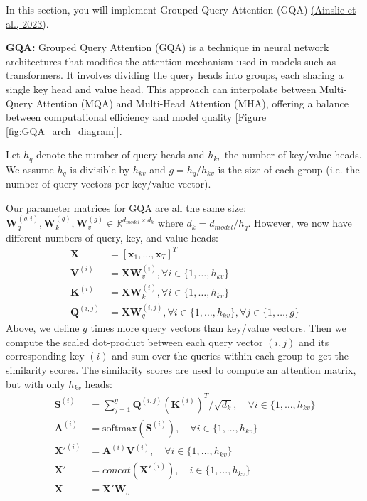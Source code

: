 \documentclass[11pt,addpoints,answers]{exam}
\newcommand{\Rb}{\mathbb{R}}
\newcommand{\xv}{\mathbf{x}}
\newcommand{\Av}{\mathbf{A}}
\newcommand{\Kv}{\mathbf{K}}
\newcommand{\Qv}{\mathbf{Q}}
\newcommand{\Sv}{\mathbf{S}}
\newcommand{\Vv}{\mathbf{V}}
\newcommand{\Wv}{\mathbf{W}}
\newcommand{\Xv}{\mathbf{X}}
\begin{document}
\begin{questions}
\begin{parts}
    In this section, you will implement Grouped Query Attention (GQA) 
    \href{https://arxiv.org/pdf/2305.13245.pdf}{(Ainslie et al., 2023)}.
    
    \textbf{GQA:} Grouped Query Attention (GQA) is a technique in neural network architectures that modifies the attention mechanism used in models such as transformers. It involves dividing the query heads into groups, each sharing a single key head and value head. This approach can interpolate between Multi-Query Attention (MQA) and Multi-Head Attention (MHA), offering a balance between computational efficiency and model quality [Figure \ref{fig:GQA_arch_diagram}].

    Let $h_q$ denote the number of query heads and $h_{kv}$ the number of key/value heads. We assume $h_q$ is divisible by $h_{kv}$ and $g = h_q / h_{kv}$ is the size of each group (i.e. the number of query vectors per key/value vector).

    Our parameter matrices for GQA are all the same size: $\Wv_q^{(g,i)},\Wv_k^{(g)},\Wv_v^{(g)} \in \Rb^{d_{model} \times d_k}$  where $d_k = d_{model}/h_q$. However, we now have different numbers of query, key, and value heads:
    \begin{align*}
        \Xv &= [\xv_1, \ldots, \xv_T]^T  \\
        \Vv^{(i)} &= \Xv \Wv_v^{(i)}, \forall i \in \{1, \ldots, h_{kv} \} \\
        \Kv^{(i)} &= \Xv \Wv_k^{(i)}, \forall i \in \{1, \ldots, h_{kv} \} \\
        \Qv^{(i,j)} &= \Xv \Wv_q^{(i,j)}, \forall i \in \{1, \ldots, h_{kv} \}, \forall j \in \{1, \ldots, g \} 
    \end{align*}
    Above, we define $g$ times more query vectors than key/value vectors. 
    Then we compute the scaled dot-product between each query vector $(i,j)$ and its corresponding key $(i)$ and sum over the queries within each group to get the similarity scores. The similarity scores are used to compute an attention matrix, but with only $h_{kv}$ heads:
    \begin{align*}
        \Sv^{(i)} &= \sum_{j=1}^{g} \Qv^{(i,j)} (\Kv^{(i)})^T / \sqrt{d_k},  \quad \forall i \in \{1, \ldots, h_{kv} \}\\
        \Av^{(i)} &= \text{softmax}(\Sv^{(i)}), \quad \forall i \in \{1, \ldots, h_{kv} \} \\
        \Xv'^{(i)} &= \Av^{(i)} \Vv^{(i)}, \quad \forall i \in \{1, \ldots, h_{kv} \}\\
        \Xv' &= concat(\Xv'^{(i)}), \quad  i \in \{1, \ldots, h_{kv} \}\\
        \Xv &= \Xv'\Wv_o
    \end{align*}


\end{parts}
\end{questions}
\end{document}
